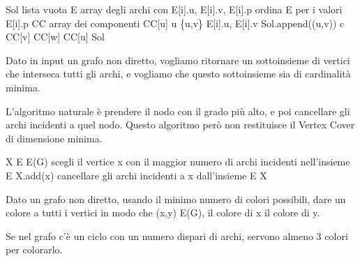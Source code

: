 \begin{algorithm}
\begin{algorithmic}
    \State Sol \gets lista vuota
    \State E \gets array degli archi con E[i].u, E[i].v, E[i].p
    \State ordina E per i valori E[i].p
    \State CC \gets array dei componenti
        \State CC[u] \gets u
    \EndFor
        \State \{u,v\} \gets E[i].u, E[i].v
            \State Sol.append((u,v))
            \State c \gets CC[v]
                    \State CC[w] \gets CC[u]
                \EndIf
            \EndFor
        \EndIf
    \EndFor
    \State \Return Sol
\EndFunction
\end{algorithmic}
\caption{Implementazione di Kruskal, con complessit\`a O(m + n^2 + n + m \log(m)) = O(n^2 + m \log (m)). Sapendo che \log (m) < \log (n), viene fuori O(n^2 + m \log (n)).}
\end{algorithm}

\begin{esercizio}
Dato in input un grafo non diretto, vogliamo ritornare un sottoinsieme di vertici che interseca tutti gli archi, e vogliamo che questo sottoinsieme sia di cardinalit\`a minima.
\end{esercizio}

L'algoritmo naturale \`e prendere il nodo con il grado pi\`u alto, e poi cancellare gli archi incidenti a quel nodo. Questo algoritmo per\`o non restituisce il Vertex Cover di dimensione minima.

\begin{algorithm}
\begin{algorithmic}
    \State X \gets \emptyset
    \State E \gets E(G)
        \State scegli il vertice x con il maggior numero di archi incidenti nell'insieme E
        \State X.add(x)
        \State cancellare gli archi incidenti a x dall'insieme E
    \EndWhile
    \State \Return X
\EndFunction
\end{algorithmic}
\caption{Algoritmo greedy per trovare un Vertex Cover (non necessariamente minimo)}
\end{algorithm}


\begin{esercizio}[Colorazione]
Dato un grafo non diretto, usando il minimo numero di colori possibili, dare un colore a tutti i vertici in modo che \forall (x,y) \in E(G), il colore di x \neq il colore di y.

Se nel grafo c'\`e un ciclo con un numero dispari di archi, servono almeno 3 colori per colorarlo.
\end{esercizio}

